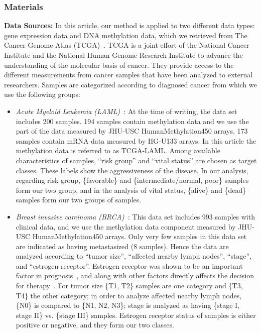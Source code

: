 \subsubsection{Materials}
\textbf{Data Sources:}
In this article, our method is applied to two different data types: gene expression data and DNA methylation data, which we retrieved from The Cancer Genome Atlas (TCGA)~\cite{tcga-ref}. TCGA is a joint effort of the National Cancer Institute and the National Human Genome Research Institute to advance the understanding of the molecular basis of cancer. They provide access to the different measurements from cancer samples that have been analyzed to external researchers. 
Samples are categorized according to diagnosed cancer from which we use the following groups:

\begin{itemize}
\item \emph{Acute Myeloid Leukemia (LAML)}~\cite{laml2013}: At the time of writing, the data set includes 200 samples. 194 samples contain methylation data and we use the part of the data measured by JHU-USC HumanMethylation450 arrays. 173 samples contain mRNA data measured by HG-U133 arrays. In this article the methylation data is referred to as TCGA-LAML. Among available characteristics of samples, ``risk group'' and ``vital status'' are chosen as target classes. These labels show the aggressiveness of the disease. 
In our analysis, regarding risk group, \{favorable\} and \{intermediate/normal, poor\} samples form our two group, and in the analysis of vital status, \{alive\} and \{dead\} samples form our two groups of samples.

\item \emph{Breast invasive carcinoma (BRCA)}~\cite{brca2012}: This data set includes 993 samples with clinical data, and we use the methylation data component measured by JHU-USC HumanMethylation450 arrays. Only very few samples in this data set are indicated as having metastasized (8 samples).
  Hence the data are analyzed according to ``tumor size'', ``affected nearby lymph nodes'', ``stage'', and ``estrogen receptor''. Estrogen receptor was shown to be an important factor in prognosis~\cite{knight1977estrogen}, and along with other factors directly affects the decision for therapy~\cite{goldhirsch2001meeting,national2001national}. For tumor size \{T1, T2\} samples are one category and \{T3, T4\} the other category; in order to analyze affected nearby lymph nodes, \{N0\} is compared to \{N1, N2, N3\}; stage is analyzed as having \{stage I, stage II\} vs. \{stage III\} samples. Estrogen receptor status of samples is either positive or negative, and they form our two classes.
\end{itemize}

